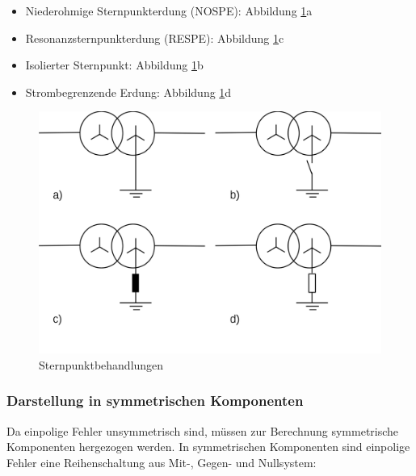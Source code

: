 \documentclass{scrartcl}
\begin{document}
\begin{onehalfspace}
\begin{itemize}
\item Niederohmige Sternpunkterdung (NOSPE): Abbildung \ref{sternpunktbehandlung}a
\item Resonanzsternpunkterdung (RESPE): Abbildung \ref{sternpunktbehandlung}c
\item Isolierter Sternpunkt: Abbildung \ref{sternpunktbehandlung}b
\item Strombegrenzende Erdung: Abbildung \ref{sternpunktbehandlung}d
\end{itemize}

	\begin{figure}[H]
	\centering
	\includegraphics[scale=0.3]{img/sternpunktbehandlung.png}
	\caption{Sternpunktbehandlungen}
	\label{sternpunktbehandlung}
	\end{figure}

\subsubsection{Darstellung in symmetrischen Komponenten}
Da einpolige Fehler unsymmetrisch sind, müssen zur Berechnung symmetrische Komponenten hergezogen werden. In symmetrischen Komponenten sind einpolige Fehler eine Reihenschaltung aus Mit-, Gegen- und Nullsystem: \\


\end{onehalfspace}
\end{document}
